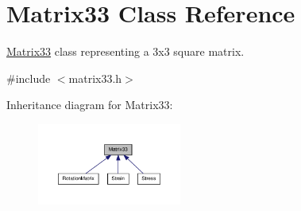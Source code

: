 \hypertarget{classMatrix33}{\section{\-Matrix33 \-Class \-Reference}
\label{de/d82/classMatrix33}
}


\hyperlink{classMatrix33}{\-Matrix33} class representing a 3x3 square matrix.  




{\ttfamily \#include $<$matrix33.\-h$>$}



\-Inheritance diagram for \-Matrix33\-:\nopagebreak
\begin{figure}[H]
\begin{center}
\leavevmode
\includegraphics[width=134pt]{dc/dfe/classMatrix33__inherit__graph}
\end{center}
\end{figure}
